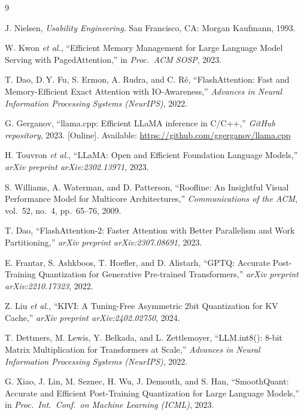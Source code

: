 \documentclass[conference]{IEEEtran}
\begin{document}
\balance
\begin{thebibliography}{9}

J. Nielsen, \textit{Usability Engineering}.
San Francisco, CA: Morgan Kaufmann, 1993.

W. Kwon \textit{et al.}, ``Efficient Memory Management for Large Language
Model Serving with PagedAttention,'' in \textit{Proc.\ ACM SOSP}, 2023.

T. Dao, D.\,Y. Fu, S. Ermon, A. Rudra, and C. R\'{e},
``FlashAttention: Fast and Memory-Efficient Exact Attention with
IO-Awareness,'' \textit{Advances in Neural Information Processing Systems
(NeurIPS)}, 2022.

G. Gerganov, ``llama.cpp: Efficient LLaMA inference in C/C++,''
\textit{GitHub repository}, 2023. [Online]. Available:
\url{https://github.com/ggerganov/llama.cpp}

H. Touvron \textit{et al.}, ``LLaMA: Open and Efficient Foundation
Language Models,'' \textit{arXiv preprint arXiv:2302.13971}, 2023.

S. Williams, A. Waterman, and D. Patterson, ``Roofline: An Insightful
Visual Performance Model for Multicore Architectures,''
\textit{Communications of the ACM}, vol.~52, no.~4, pp.~65--76, 2009.

T. Dao, ``FlashAttention-2: Faster Attention with Better Parallelism and
Work Partitioning,'' \textit{arXiv preprint arXiv:2307.08691}, 2023.

E. Frantar, S. Ashkboos, T. Hoefler, and D. Alistarh, ``GPTQ: Accurate
Post-Training Quantization for Generative Pre-trained Transformers,''
\textit{arXiv preprint arXiv:2210.17323}, 2022.

Z. Liu \textit{et al.}, ``KIVI: A Tuning-Free Asymmetric 2bit
Quantization for KV Cache,'' \textit{arXiv preprint arXiv:2402.02750},
2024.

T. Dettmers, M. Lewis, Y. Belkada, and L. Zettlemoyer,
``LLM.int8(): 8-bit Matrix Multiplication for Transformers at Scale,''
\textit{Advances in Neural Information Processing Systems (NeurIPS)},
2022.

G. Xiao, J. Lin, M. Seznec, H. Wu, J. Demouth, and S. Han,
``SmoothQuant: Accurate and Efficient Post-Training Quantization for
Large Language Models,'' in \textit{Proc.\ Int.\ Conf.\ on Machine
Learning (ICML)}, 2023.


\end{thebibliography}
\end{document}
